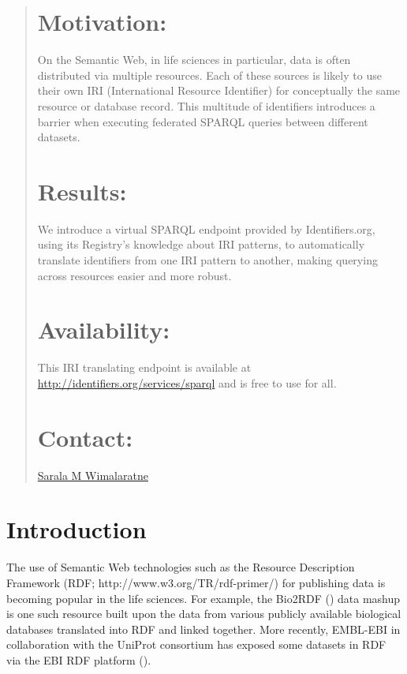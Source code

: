 \documentclass{bioinfo}
\begin{document}
\begin{abstract}
\section{Motivation:}
On the Semantic Web, in life sciences in particular, data is often distributed via multiple resources. Each of these sources is likely to use their own IRI (International Resource Identifier) for conceptually the same resource or database record. This multitude of identifiers introduces a barrier when executing federated SPARQL queries between different datasets.

\section{Results:}
We introduce a virtual SPARQL endpoint provided by Identifiers.org, using its Registry's knowledge about IRI patterns, to automatically translate identifiers from one IRI pattern to another, making querying across resources easier and more robust.

\section{Availability:}
This IRI translating endpoint is available at \linebreak\href{http://identifiers.org/services/sparql}{http://identifiers.org/services/sparql} and is free to use for all.

\section{Contact:} \href{sarala@ebi.ac.uk}{Sarala M Wimalaratne}
\end{abstract}

\section{Introduction}
The use of Semantic Web technologies such as the Resource Description Framework (RDF; http://www.w3.org/TR/rdf-primer/) for publishing data is becoming popular in the life sciences.
For example, the Bio2RDF (\cite{Biordf2}) data mashup is one such resource built upon the data from various publicly available biological databases translated into RDF and linked together. More recently, EMBL-EBI in collaboration with the UniProt consortium has exposed some datasets in RDF via the EBI RDF platform (\cite{Jupp01052014}).
\end{document}
